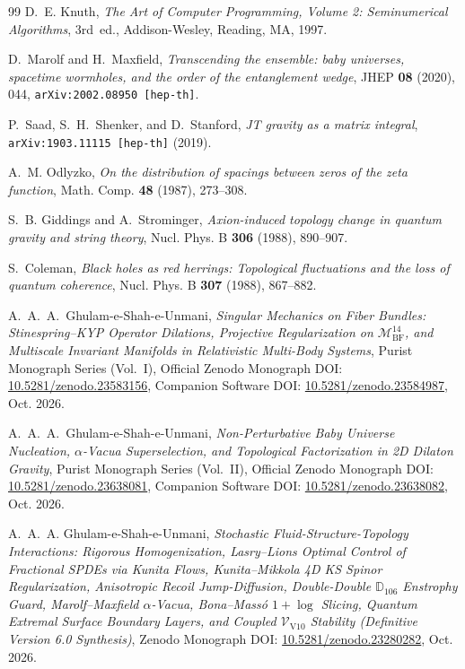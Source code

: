 \documentclass[11pt,a4paper,reqno]{article}
\theoremstyle{plain}
\theoremstyle{definition}
\theoremstyle{remark}
\numberwithin{equation}{section}
\begin{document}
\begin{thebibliography}{99}
D.~E. Knuth,
\textit{The Art of Computer Programming, Volume 2: Seminumerical Algorithms}, 3rd~ed.,
Addison-Wesley, Reading, MA, 1997.

D.~Marolf and H.~Maxfield,
\textit{Transcending the ensemble: baby universes, spacetime wormholes, and the order of the entanglement wedge},
JHEP \textbf{08} (2020), 044, \texttt{arXiv:2002.08950 [hep-th]}.

P.~Saad, S.~H.~Shenker, and D.~Stanford,
\textit{JT gravity as a matrix integral},
\texttt{arXiv:1903.11115 [hep-th]} (2019).

A.~M. Odlyzko,
\textit{On the distribution of spacings between zeros of the zeta function},
Math. Comp. \textbf{48} (1987), 273--308.

S.~B. Giddings and A.~Strominger,
\textit{Axion-induced topology change in quantum gravity and string theory},
Nucl. Phys. B \textbf{306} (1988), 890--907.

S.~Coleman,
\textit{Black holes as red herrings: Topological fluctuations and the loss of quantum coherence},
Nucl. Phys. B \textbf{307} (1988), 867--882.

A.~A.~A.~Ghulam-e-Shah-e-Unmani,
\textit{Singular Mechanics on Fiber Bundles: Stinespring--KYP Operator Dilations, Projective Regularization on $\mathcal{M}_{\mathrm{BF}}^{14}$, and Multiscale Invariant Manifolds in Relativistic Multi-Body Systems},
Purist Monograph Series (Vol.~I),
Official Zenodo Monograph DOI: \href{https://doi.org/10.5281/zenodo.23583156}{10.5281/zenodo.23583156},
Companion Software DOI: \href{https://doi.org/10.5281/zenodo.23584987}{10.5281/zenodo.23584987}, Oct. 2026.

A.~A.~A.~Ghulam-e-Shah-e-Unmani,
\textit{Non-Perturbative Baby Universe Nucleation, $\alpha$-Vacua Superselection, and Topological Factorization in 2D Dilaton Gravity},
Purist Monograph Series (Vol.~II),
Official Zenodo Monograph DOI: \href{https://doi.org/10.5281/zenodo.23638081}{10.5281/zenodo.23638081},
Companion Software DOI: \href{https://doi.org/10.5281/zenodo.23638082}{10.5281/zenodo.23638082}, Oct. 2026.

A.~A.~A. Ghulam-e-Shah-e-Unmani,
\textit{Stochastic Fluid-Structure-Topology Interactions: Rigorous Homogenization, Lasry--Lions Optimal Control of Fractional SPDEs via Kunita Flows, Kunita--Mikkola 4D KS Spinor Regularization, Anisotropic Recoil Jump-Diffusion, Double-Double $\mathbb{D}_{106}$ Enstrophy Guard, Marolf--Maxfield $\alpha$-Vacua, Bona--Mass\'o $1+\log$ Slicing, Quantum Extremal Surface Boundary Layers, and Coupled $\mathcal{V}_{\mathrm{V10}}$ Stability (Definitive Version 6.0 Synthesis)},
Zenodo Monograph DOI: \href{https://doi.org/10.5281/zenodo.23280282}{10.5281/zenodo.23280282}, Oct. 2026.


\end{thebibliography}
\end{document}
